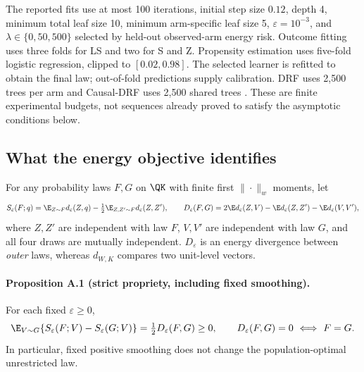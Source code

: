 The reported fits use at most 100 iterations, initial step size $0.12$, depth 4, minimum total leaf size 10, minimum arm-specific leaf size 5, $\varepsilon=10^{-3}$, and $\lambda\in\{0,50,500\}$ selected by held-out observed-arm energy risk. Outcome fitting uses three folds for LS and two for S and Z. Propensity estimation uses five-fold logistic regression, clipped to $[0.02,0.98]$. The selected learner is refitted to obtain the final law; out-of-fold predictions supply calibration. DRF uses 2,500 trees per arm and Causal-DRF uses 2,500 shared trees \citep{DRF-paper,naf2026causaldrf}. These are finite experimental budgets, not sequences already proved to satisfy the asymptotic conditions below.

\subsection{What the energy objective identifies}

For any probability laws $F,G$ on $\QK$ with finite first $\|\cdot\|_w$ moments, let
\[
 S_\varepsilon(F;q)=\E_{Z\sim F}d_\varepsilon(Z,q)
 -\tfrac12\E_{Z,Z'\sim F}d_\varepsilon(Z,Z'),\qquad
 D_\varepsilon(F,G)=2\E d_\varepsilon(Z,V)-\E d_\varepsilon(Z,Z')-\E d_\varepsilon(V,V'),
\]
where $Z,Z'$ are independent with law $F$, $V,V'$ are independent with law $G$, and all four draws are mutually independent. $D_\varepsilon$ is an energy divergence between \emph{outer} laws, whereas $d_{W,K}$ compares two unit-level vectors.

\paragraph{Proposition A.1 (strict propriety, including fixed smoothing).}
For each fixed $\varepsilon\geq0$,
\begin{equation}
 \E_{V\sim G}\{S_\varepsilon(F;V)-S_\varepsilon(G;V)\}
 =\tfrac12D_\varepsilon(F,G)\geq0,
 \qquad D_\varepsilon(F,G)=0\ \Longleftrightarrow\ F=G.
 \label{eq:app-proper}
\end{equation}
In particular, fixed positive smoothing does not change the population-optimal unrestricted law.

